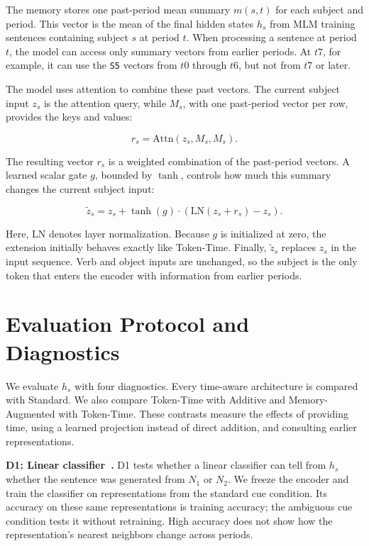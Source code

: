 \documentclass[runningheads]{llncs}
\begin{document}
The memory stores one past-period mean summary
\(m(s,t)\) for each subject and period. This vector is the mean of the final
hidden states \(h_s\) from MLM training sentences containing subject \(s\) at
period \(t\). When processing a sentence at period \(t\), the model can access
only summary vectors from earlier periods. At \(t7\), for example, it can use
the \texttt{S5} vectors from \(t0\) through \(t6\), but not from \(t7\) or
later.

The model uses attention to combine these past vectors. The current subject
input \(z_s\) is the attention query, while \(M_s\), with one past-period vector
per row, provides the keys and values:

\[
  r_s = \mathrm{Attn}(z_s, M_s, M_s).
\]

The resulting vector \(r_s\) is a weighted combination of the past-period
vectors. A learned scalar gate \(g\), bounded by \(\tanh\), controls how much
this summary changes the current subject input:

\[
  \tilde{z}_s =
  z_s + \tanh(g) \cdot
  \left(\mathrm{LN}(z_s + r_s) - z_s\right).
\]

Here, \(\mathrm{LN}\) denotes layer normalization. Because \(g\) is initialized
at zero, the extension initially behaves exactly like Token-Time. Finally,
\(\tilde{z}_s\) replaces \(z_s\) in the input sequence. Verb and object
inputs are unchanged, so the subject is the only token that enters the
encoder with information from earlier periods.

\section{Evaluation Protocol and Diagnostics}
We evaluate \(h_s\) with four diagnostics. Every time-aware architecture is
compared with Standard. We also compare Token-Time with Additive and
Memory-Augmented with Token-Time. These contrasts measure the effects of
providing time, using a learned projection instead of direct addition, and
consulting earlier representations.

\textbf{D1: Linear classifier~\cite{conneau2018probing}.} D1 tests whether a linear
classifier can tell from \(h_s\) whether the sentence was generated from
\(N_1\) or \(N_2\). We freeze the encoder and train the classifier on representations
from the standard cue condition. Its accuracy on these same representations is
training accuracy; the ambiguous cue condition tests it without retraining. High
accuracy does not show how the representation's nearest neighbors change across
periods.
\end{document}
